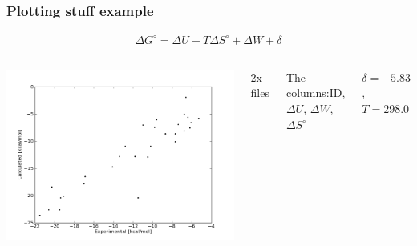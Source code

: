 \begin{frame}[fragile]

    \frametitle{Plotting stuff example}

    \begin{align*}
        \Delta G^\circ = \Delta U - T \Delta S^\circ + \Delta W + \delta
    \end{align*}

    \begin{columns}[t]


            \includegraphics[width=1.2\textwidth]{images/binding_energy.png}


            2x files

            The columns:\newline ID, $\Delta U$, $\Delta W$, $\Delta S^\circ$

            $\delta = -5.83$, $T = 298.0$

    \end{columns}

\end{frame}


